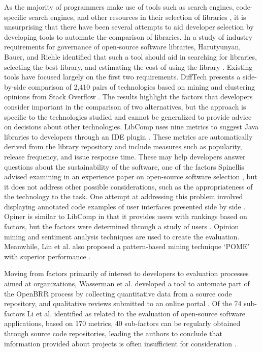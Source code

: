 As the majority of programmers make use of tools such as search engines, code-specific search engines, and other resources in their selection of libraries \cite{umarji2008archetypal}, it is unsurprising that there have been several attempts to aid developer selection by developing tools to automate the comparison of libraries. In a study of industry requirements for governance of open-source software libraries, Harutyunyan, Bauer, and Riehle identified that such a tool should aid in searching for libraries, selecting the best library, and estimating the cost of using the library \cite{harutyunyan:2018:understanding}. Existing tools have focused largely on the first two requirements. DiffTech presents a side-by-side comparison of 2,410 pairs of technologies based on mining and clustering opinions from Stack Overflow \cite{huang2018tell, wang2020difftech, wang2021difftech}. The results highlight the factors that developers consider important in the comparison of two alternatives, but the approach is specific to the technologies studied and cannot be generalized to provide advice on decisions about other technologies. LibComp uses nine metrics to suggest Java libraries to developers through an IDE plugin \cite{de2018library, de2018empirical, el2020libcomp}. These metrics are automatically derived from the library repository and include measures such as popularity, release frequency, and issue response time. These may help developers answer questions about the sustainability of the software, one of the factors Spinellis advised examining in an experience paper on open-source software selection \cite{spinellis2019select}, but it does not address other possible considerations, such as the appropriateness of the technology to the task. One attempt at addressing this problem involved displaying annotated code examples of user interfaces presented side by side \cite{yan2022concept}. Opiner is similar to LibComp in that it provides users with rankings based on factors, but the factors were determined through a study of users \cite{uddin2019automatic, uddin2022empirical}. Opinion mining and sentiment analysis techniques are used to create the evaluation. Meanwhile, Lin et al. also proposed a pattern-based mining technique `POME' with superior performance \cite{lin2019pattern}.   

Moving from factors primarily of interest to developers to evaluation processes aimed at organizations, Wasserman et al. developed a tool to automate part of the OpenBRR process by collecting quantitative data from a source code repository, and qualitative reviews submitted to an online portal \cite{wasserman2017osspal}. Of the 74 sub-factors Li et al. identified as related to the evaluation of open-source software applications, based on 170 metrics, 40 sub-factors can be regularly obtained through source code repositories, leading the authors to conclude that information provided about projects is often insufficient for consideration \cite{li2022exploring}.

